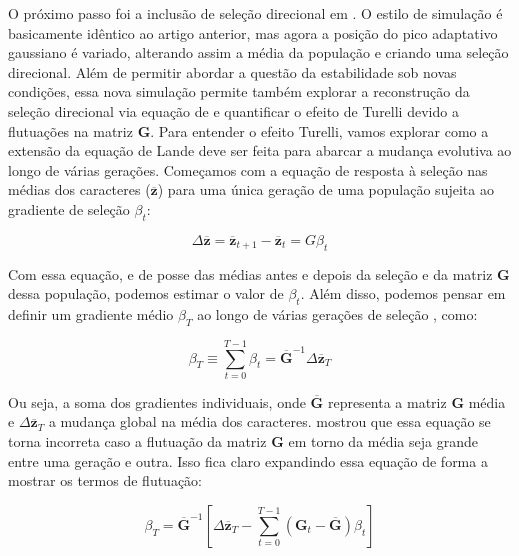 O próximo passo foi a inclusão de seleção direcional em \cite{Jones2004}.
O estilo de simulação é basicamente idêntico ao artigo anterior, mas
agora a posição do pico adaptativo gaussiano é variado, alterando assim
a média da população e criando uma seleção direcional.
Além de permitir abordar a questão da estabilidade sob novas condições,
essa nova simulação permite também explorar a reconstrução da seleção
direcional via equação de \cite{Lande1979} e quantificar o efeito de
Turelli devido a flutuações na matriz $\mathbf{G}$.
Para entender o efeito Turelli, vamos explorar como a extensão da
equação de Lande deve ser feita para abarcar a mudança evolutiva ao
longo de várias gerações.
Começamos com a equação de resposta à seleção nas médias dos caracteres
($\overline {\mathbf{z}}$) para uma única geração de uma população sujeita ao
gradiente de seleção $\beta_t$:

\begin{equation}
    \Delta \overline {\mathbf{z}} = \overline {\mathbf{z}}_{t+1}-\overline {\mathbf{z}}_{t}=G\beta_t
\end{equation}

Com essa equação, e de posse das médias antes e depois da seleção e da
matriz $\mathbf{G}$ dessa população, podemos estimar o valor de $\beta_t$.
Além disso, podemos pensar em definir um gradiente médio $\beta_T$ ao
longo de várias gerações de seleção \citep{Lande1979}, como:

\begin{equation}
    \beta_{T}\equiv \sum _{t=0}^{T-1} \beta_t =  \overline {\mathbf{G}}^{-1}\Delta \overline {\mathbf{z}}_T 
\label{betatotal}
\end{equation}

Ou seja, a soma dos gradientes individuais, onde $\overline {\mathbf{G}}$
representa a matriz $\mathbf{G}$ média e $\Delta \overline {\mathbf{z}}_T$ a mudança global
na média dos caracteres.
\cite{Turelli1988} mostrou que essa equação se torna incorreta caso a
flutuação da matriz $\mathbf{G}$ em torno da média seja grande entre uma geração e
outra.
Isso fica claro expandindo essa equação de forma a mostrar os termos de
flutuação:

\begin{equation}
   \beta_T = \mathbf{\overline{G}}^{-1} \left[ \Delta \mathbf{\overline{z}}_T - \sum_{t=0}^{T-1} (\mathbf{G}_t - \mathbf{\overline{G}}) \beta_t\right]
\end{equation}

